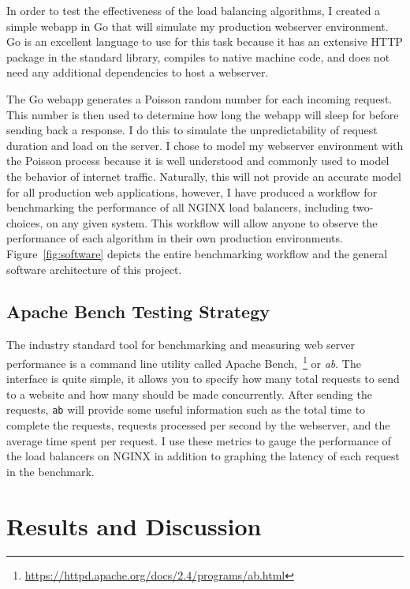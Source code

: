 In order to test the effectiveness of the load balancing algorithms, I
created a simple webapp in Go that will simulate my production
webserver environment. Go is an excellent language to use for this
task because it has an extensive HTTP package in the standard library,
compiles to native machine code, and does not need any additional
dependencies to host a webserver.

The Go webapp generates a Poisson random number for each incoming
request. This number is then used to determine how long the webapp
will sleep for before sending back a response. I do this to simulate
the unpredictability of request duration and load on the server. I
chose to model my webserver environment with the Poisson process
because it is well understood and commonly used to model the behavior
of internet traffic. Naturally, this will not provide an accurate
model for all production web applications, however, I have produced a
workflow for benchmarking the performance of all NGINX load balancers,
including two-choices, on any given system. This workflow will allow
anyone to observe the performance of each algorithm in their own
production environments. Figure~\ref{fig:software} depicts the entire
benchmarking workflow and the general software architecture of this
project.

\subsection{Apache Bench Testing Strategy}
The industry standard tool for benchmarking and measuring web server
performance is a command line utility called Apache
Bench,~\footnote{\url{https://httpd.apache.org/docs/2.4/programs/ab.html}}
or \emph{ab}. The interface is quite simple, it allows you to specify
how many total requests to send to a website and how many should be
made concurrently. After sending the requests, \texttt{ab} will
provide some useful information such as the total time to complete the
requests, requests processed per second by the webserver, and the
average time spent per request. I use these metrics to gauge the
performance of the load balancers on NGINX in addition to graphing the
latency of each request in the benchmark.

\section{Results and Discussion}

